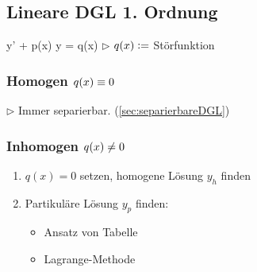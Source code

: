 \subsection{Lineare DGL 1. Ordnung}
    \vspace{0.5em}
    \mathbox%
    {
        y' + p(x) \cdot y = q(x)
    }
    $\triangleright$ $q(x) \vcentcolon=$ Störfunktion
    
    \subsubsection{Homogen \texorpdfstring{$\hfill q(x) \equiv 0$}{q(x) = 0}}
        \vspace{0.5em}
        $\triangleright$ Immer separierbar. (\ref{sec:separierbareDGL})
    \subsubsection{Inhomogen \texorpdfstring{$\hfill q(x) \neq 0$}{q(x) =/= 0}}\label{sec:1.Ord-homogen}
        \vspace{0.5em}
        \begin{enumerate}
            \item $q(x) = 0$ setzen, homogene Lösung $y_h$ finden
            \item Partikuläre Lösung $y_p$ finden:
            \begin{itemize}
                \item Ansatz von Tabelle %
                \item Lagrange-Methode %
            \end{itemize}
        \end{enumerate}

